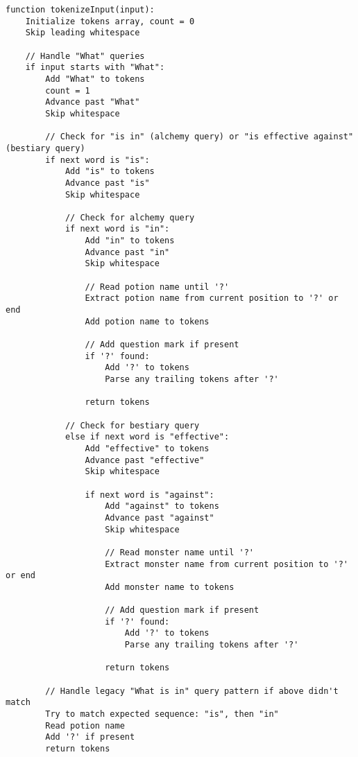 \documentclass{article}
\begin{document}
\begin{verbatim}
function tokenizeInput(input):
    Initialize tokens array, count = 0
    Skip leading whitespace

    // Handle "What" queries
    if input starts with "What":
        Add "What" to tokens
        count = 1
        Advance past "What"
        Skip whitespace

        // Check for "is in" (alchemy query) or "is effective against" (bestiary query)
        if next word is "is":
            Add "is" to tokens
            Advance past "is"
            Skip whitespace
            
            // Check for alchemy query
            if next word is "in":
                Add "in" to tokens
                Advance past "in"
                Skip whitespace
                
                // Read potion name until '?'
                Extract potion name from current position to '?' or end
                Add potion name to tokens
                
                // Add question mark if present
                if '?' found:
                    Add '?' to tokens
                    Parse any trailing tokens after '?'
                
                return tokens
                
            // Check for bestiary query
            else if next word is "effective":
                Add "effective" to tokens
                Advance past "effective"
                Skip whitespace
                
                if next word is "against":
                    Add "against" to tokens
                    Advance past "against"
                    Skip whitespace
                    
                    // Read monster name until '?'
                    Extract monster name from current position to '?' or end
                    Add monster name to tokens
                    
                    // Add question mark if present
                    if '?' found:
                        Add '?' to tokens
                        Parse any trailing tokens after '?'
                    
                    return tokens
            
        // Handle legacy "What is in" query pattern if above didn't match
        Try to match expected sequence: "is", then "in"
        Read potion name
        Add '?' if present
        return tokens
    

\end{verbatim}
\end{document}
